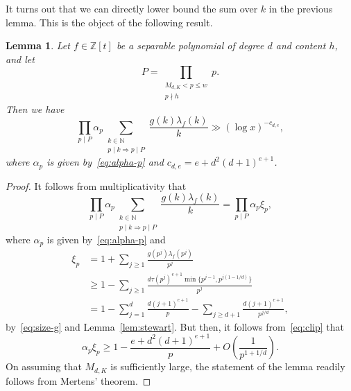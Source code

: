 \documentclass[11pt,letterpaper]{amsart}
\renewcommand{\leq}{\leqslant}
\renewcommand{\geq}{\geqslant}
\newtheorem{lemma}[theorem]{Lemma}
\theoremstyle{definition}
\numberwithin{equation}{section}
\newcommand\NN{\mathbb{N}}
\newcommand{\0}{\mathbf{0}}
\begin{document}
It turns out that we can directly lower bound the sum over  $k$ in 
the previous lemma. This is the object of the following result.

\begin{lemma}\label{lem:lower-ksum}
Let $f\in \mathbb{Z}[t]$ be a  
 separable polynomial of degree $d$ and  content $h$, and let
$$
P=\prod_{\substack{M_{d,K}<p\leq w\\ p\nmid h}} p.
$$
Then 
we have 
$$
\prod_{p\mid P} \alpha_p
\sum_{\substack{k\in \NN\\
p\mid  k \Rightarrow p\mid 
P}}
\frac{g(k) 	
\lambda_{f}(k)}{k}\gg (\log x)^{-c_{d,e}},
$$
where $\alpha_p$ is given by~\eqref{eq:alpha-p}
and 
$c_{d,e}=e+d^2(d+1)^{e+1}$.
\end{lemma}


\begin{proof}
It  follows from  multiplicativity that 
$$\prod_{p\mid P} \alpha_p
\sum_{\substack{k\in \NN\\
p\mid  k \Rightarrow p\mid P}}
\frac{g(k) 	
\lambda_{f}(k)}{k}
=
\prod_{p\mid P} \alpha_p\xi_p,
$$
where $\alpha_p$ is given by~\eqref{eq:alpha-p} and 
\begin{align*}
\xi_p&=1+\sum_{j\geq 1} \frac{g(p^j)\lambda_{f}(p^j)}{p^j}\\
&\geq 1-\sum_{j\geq 1}\frac{d\tau(p^j)^{e+1}\min\{p^{j-1}, p^{j(1-1/d)}\}
}{p^j}\\
&= 1-\sum_{j=1}^{d} \frac{d(j+1)^{e+1}}{p}
-
\sum_{j\geq d+1}\frac{d(j+1)^{e+1}}{p^{j/d}},
\end{align*}
by~\eqref{eq:size-g} and Lemma~\ref{lem:stewart}.
But then, it follows from~\eqref{eq:clip} that 
$$
\alpha_p\xi_p\geq 1- \frac{e+d^2(d+1)^{e+1}}{p} +O\left(\frac{1}{p^{1+1/d}}\right).
$$
On assuming that $M_{d,K}$ is sufficiently large, the statement of the lemma readily follows from Mertens' theorem. 
\end{proof}
\end{document}
